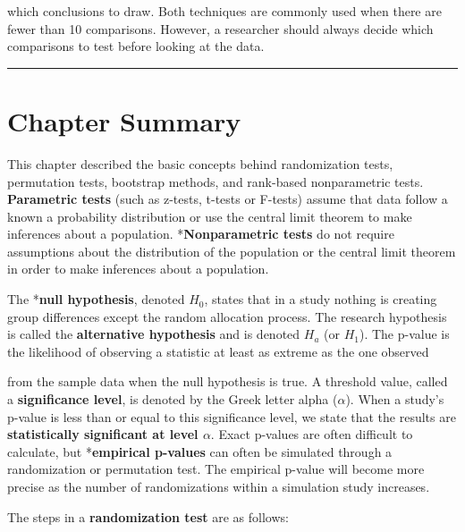 \documentclass[
]{report}
\begin{document}
which conclusions to draw. Both techniques are commonly used when there are fewer than 10 comparisons. However, a researcher should always decide which comparisons to test before looking at the data.

\begin{center}\rule{0.5\linewidth}{0.5pt}\end{center}

\section*{\texorpdfstring{\textbf{Chapter Summary}}{Chapter Summary}}\label{chapter-summary}

This chapter described the basic concepts behind randomization tests, permutation tests, bootstrap methods, and rank-based nonparametric tests. \textbf{Parametric tests} (such as z-tests, t-tests or F-tests) assume that data follow a known a probability distribution or use the central limit theorem to make inferences about a population. *\textbf{Nonparametric tests} do not require assumptions about the distribution of the population or the central limit theorem in order to make inferences about a population.

The *\textbf{null hypothesis}, denoted \(H_0\), states that in a study nothing is creating group differences except the random allocation process. The research hypothesis is called the \textbf{alternative hypothesis} and is denoted \(H_a\) (or \(H_1\)). The p-value is the likelihood of observing a statistic at least as extreme as the one observed

from the sample data when the null hypothesis is true. A threshold value, called a \textbf{significance level}, is denoted by the Greek letter alpha (\(\alpha\)). When a study's p-value is less than or equal to this significance level, we state that the results are \textbf{statistically significant at level \(\alpha\)}. Exact p-values are often difficult to calculate, but *\textbf{empirical p-values} can often be simulated through a randomization or permutation test. The empirical p-value will become more precise as the number of randomizations within a simulation study
increases.

The steps in a \textbf{randomization test} are as follows:
\end{document}
